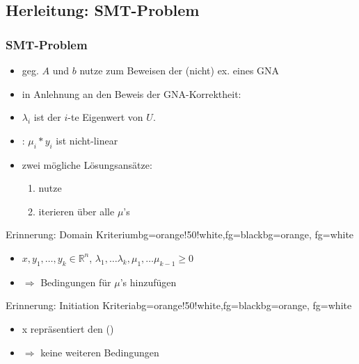 \subsection{Herleitung: SMT-Problem}
\begin{frame}
	\frametitle{SMT-Problem}
	\begin{itemize}
		\item geg. $A$ und $b$ nutze \solver zum Beweisen der (nicht) ex. eines GNA
		\item in Anlehnung an den Beweis der GNA-Korrektheit:
		\item[]	\begin{definition}
					$\lambda_i$ ist der $i$-te Eigenwert von $U$.
				\end{definition}
		\item {}: $\mu_i*y_i$ ist nicht-linear
		\item[] zwei m\"ogliche L\"osungsans\"atze:
			\begin{enumerate}
				\item nutze \qfnia
				\item iterieren \"uber alle $\mu$'s
			\end{enumerate}
	\end{itemize}
\end{frame}

\begin{frame}
	\begin{variableblock}{Erinnerung: Domain Kriterium}{bg=orange!50!white,fg=black}{bg=orange, fg=white}
		\begin{itemize}
			\setlength{\itemindent}{1cm}
			\item[(domain)] $x, y_1, \dots, y_k \in \mathbb{R}^n$, $\lambda_1, \dots \lambda_k, \mu_1, \dots \mu_{k-1} \ge 0$
		\end{itemize}
	\end{variableblock}
	\begin{itemize}
		\item[] $\Rightarrow$ Bedingungen f\"ur  $\mu$'s hinzufügen
	\end{itemize}
	\begin{variableblock}{Erinnerung: Initiation Kriteria}{bg=orange!50!white,fg=black}{bg=orange, fg=white}
		\begin{itemize}
			\setlength{\itemindent}{1cm}
			\item[(init)] x repr\"asentiert den \startterm (\stem)
		\end{itemize}
	\end{variableblock}
	\begin{itemize}
		\item[] $\Rightarrow$ keine weiteren Bedingungen
	\end{itemize}
	
\end{frame}

